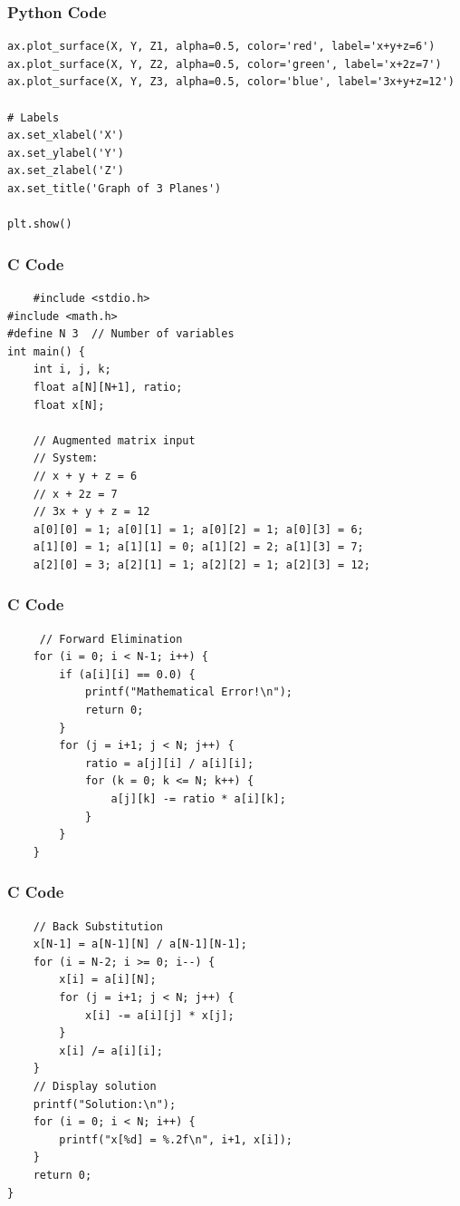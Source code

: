 \documentclass{beamer}
\begin{document}
\begin{frame}[fragile]
\frametitle{Python Code}
    \begin{lstlisting}
ax.plot_surface(X, Y, Z1, alpha=0.5, color='red', label='x+y+z=6')
ax.plot_surface(X, Y, Z2, alpha=0.5, color='green', label='x+2z=7')
ax.plot_surface(X, Y, Z3, alpha=0.5, color='blue', label='3x+y+z=12')

# Labels
ax.set_xlabel('X')
ax.set_ylabel('Y')
ax.set_zlabel('Z')
ax.set_title('Graph of 3 Planes')

plt.show() 
    \end{lstlisting}
\end{frame}
\begin{frame}[fragile]
\frametitle{C Code}
\begin{lstlisting}
    #include <stdio.h>
#include <math.h>
#define N 3  // Number of variables
int main() {
    int i, j, k;
    float a[N][N+1], ratio;
    float x[N];

    // Augmented matrix input
    // System:
    // x + y + z = 6
    // x + 2z = 7
    // 3x + y + z = 12
    a[0][0] = 1; a[0][1] = 1; a[0][2] = 1; a[0][3] = 6;
    a[1][0] = 1; a[1][1] = 0; a[1][2] = 2; a[1][3] = 7;
    a[2][0] = 3; a[2][1] = 1; a[2][2] = 1; a[2][3] = 12;
\end{lstlisting}   
\end{frame}
\begin{frame}[fragile]
\frametitle{C Code}
\begin{lstlisting}
     // Forward Elimination
    for (i = 0; i < N-1; i++) {
        if (a[i][i] == 0.0) {
            printf("Mathematical Error!\n");
            return 0;
        }
        for (j = i+1; j < N; j++) {
            ratio = a[j][i] / a[i][i];
            for (k = 0; k <= N; k++) {
                a[j][k] -= ratio * a[i][k];
            }
        }
    }

\end{lstlisting}   
\end{frame}
\begin{frame}[fragile]
\frametitle{C Code}
\begin{lstlisting}
    // Back Substitution
    x[N-1] = a[N-1][N] / a[N-1][N-1];
    for (i = N-2; i >= 0; i--) {
        x[i] = a[i][N];
        for (j = i+1; j < N; j++) {
            x[i] -= a[i][j] * x[j];
        }
        x[i] /= a[i][i];
    }
    // Display solution
    printf("Solution:\n");
    for (i = 0; i < N; i++) {
        printf("x[%d] = %.2f\n", i+1, x[i]);
    }
    return 0;
}
\end{lstlisting}   
\end{frame}
\end{document}
